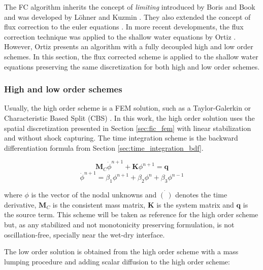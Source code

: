 The FC algorithm inherits the concept of \emph{limiting} introduced by Boris and Book \cite{boris1973} and was developed by Löhner \cite{lohner2008ch9} and Kuzmin \cite{kuzmin2001}. They also extended the concept of flux correction to the euler equations \cite{lohner2008ch9, kuzmin2005b}. In more recent developments, the flux correction technique was applied to the shallow water equations by Ortiz \cite{ortiz2012}. However, Ortiz presents an algorithm with a fully decoupled high and low order schemes. In this section, the flux corrected scheme is applied to the shallow water equations preserving the same discretization for both high and low order schemes. 



\subsubsection{High and low order schemes}

Usually, the high order scheme is a FEM solution, such as a Taylor-Galerkin \cite{lohner2008ch6} or Characteristic Based Split (CBS) \cite{ortiz2012}.
In this work, the high order solution uses the spatial discretization presented in Section \ref{sec:fic_fem} with linear stabilization and without shock capturing. The time integration scheme is the backward differentiation formula from Section \ref{sec:time_integration_bdf}.

\begin{equation} \label{ho}
\mathbf{M}_C\dot{\phi}^{n+1} + \mathbf{K}\phi^{n+1} = \mathbf{q}
\end{equation}
\begin{equation} \label{bdf}
\dot{\phi}^{n+1} = \beta_1\phi^{n+1} + \beta_2\phi^{n} + \beta_3\phi^{n-1}
\end{equation}

where $\phi$ is the vector of the nodal unknowns and $\dot{(\ )}$ denotes the time derivative, $\mathbf{M}_C$ is the consistent mass matrix, $\mathbf{K}$ is the system matrix and $\mathbf{q}$ is the source term. This scheme will be taken as reference for the high order scheme but, as any stabilized and not monotonicity preserving formulation, is not oscillation-free, specially near the wet-dry interface.

The low order solution is obtained from the high order scheme with a mass lumping procedure and adding scalar diffusion to the high order scheme:

